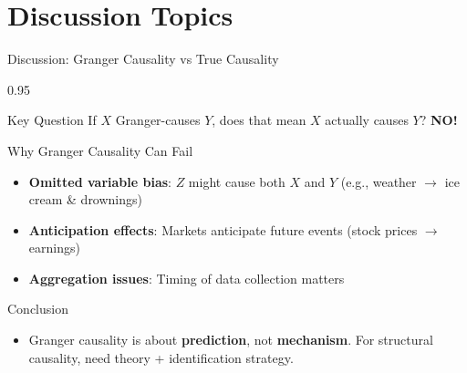 \documentclass[9pt, aspectratio=169, t]{beamer}
\begin{document}
\section{Discussion Topics}

\begin{frame}{Discussion: Granger Causality vs True Causality}
    \begin{cminipage}{0.95\textwidth}
    {\small
    \begin{alertblock}{Key Question}
        If $X$ Granger-causes $Y$, does that mean $X$ actually causes $Y$? \textbf{NO!}
    \end{alertblock}
    \begin{block}{Why Granger Causality Can Fail}
        \begin{itemize}\setlength{\itemsep}{0pt}
            \item \textbf{Omitted variable bias}: $Z$ might cause both $X$ and $Y$ (e.g., weather $\to$ ice cream \& drownings)
            \item \textbf{Anticipation effects}: Markets anticipate future events (stock prices $\to$ earnings)
            \item \textbf{Aggregation issues}: Timing of data collection matters
        \end{itemize}
    \end{block}
    \begin{exampleblock}{Conclusion}
        \begin{itemize}\setlength{\itemsep}{0pt}
            \item Granger causality is about \textbf{prediction}, not \textbf{mechanism}. For structural causality, need theory + identification strategy.
        \end{itemize}
    \end{exampleblock}
    }
    \end{cminipage}
\end{frame}
\end{document}
